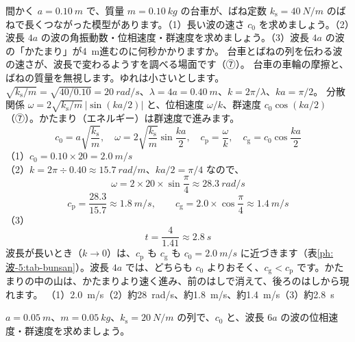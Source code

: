 \label{ph:波-5:ex12}
\begin{phreidai}[ばねとおもりの列の位相速度と群速度]
間かく $a=\qty{0.10}{m}$ で、質量 $m=\qty{0.10}{kg}$ の台車が、ばね定数 $k_{\mathrm s}=\qty{40}{N/m}$ のばねで長くつながった模型があります。（1）長い波の速さ $c_0$ を求めましょう。（2）波長 $4a$ の波の角振動数・位相速度・群速度を求めましょう。（3）波長 $4a$ の波の「かたまり」が\qty{4}{m}進むのに何秒かかりますか。
\phbamen
台車とばねの列を伝わる波の速さが、波長で変わるようすを調べる場面です（⑦）。
\phmushi
台車の車輪の摩擦と、ばねの質量を無視します。ゆれは小さいとします。
\phzu
$\sqrt{k_{\mathrm s}/m}=\sqrt{40/0.10}=\qty{20}{rad/s}$、$\lambda=4a=\qty{0.40}{m}$、$k=2\pi/\lambda$、$ka=\pi/2$。
\phriyu
分散関係 $\omega=2\sqrt{k_{\mathrm s}/m}\,|\sin(ka/2)|$ と、位相速度 $\omega/k$、群速度 $c_0\cos(ka/2)$（⑦）。かたまり（エネルギー）は群速度で進みます。
\phtateru
\[c_0=a\sqrt{\frac{k_{\mathrm s}}{m}},\quad\omega=2\sqrt{\frac{k_{\mathrm s}}{m}}\sin\frac{ka}{2},\quad c_{\mathrm p}=\frac{\omega}{k},\quad c_{\mathrm g}=c_0\cos\frac{ka}{2}\]
\phtoku
（1）$c_0=0.10\times20=\qty{2.0}{m/s}$\\
（2）$k=2\pi\div0.40\approx\qty{15.7}{rad/m}$、$ka/2=\pi/4$ なので、
\[\omega=2\times20\times\sin\frac{\pi}{4}\approx\qty{28.3}{rad/s}\]
\[c_{\mathrm p}=\frac{28.3}{15.7}\approx\qty{1.8}{m/s},\qquad c_{\mathrm g}=2.0\times\cos\frac{\pi}{4}\approx\qty{1.4}{m/s}\]
（3）\[t=\frac{4}{1.41}\approx\qty{2.8}{s}\]
\phtashikame
波長が長いとき（$k\to0$）は、$c_{\mathrm p}$ も $c_{\mathrm g}$ も $c_0=\qty{2.0}{m/s}$ に近づきます（表\ref{ph:波-5:tab-bunsan}）。波長 $4a$ では、どちらも $c_0$ よりおそく、$c_{\mathrm g}<c_{\mathrm p}$ です。かたまりの中の山は、かたまりより速く進み、前のはしで消えて、後ろのはしから現れます。
\kotae （1）\qty{2.0}{m/s}（2）約\qty{28}{rad/s}、約\qty{1.8}{m/s}、約\qty{1.4}{m/s}（3）約\qty{2.8}{s}
\end{phreidai}
\begin{jibun}
$a=\qty{0.05}{m}$、$m=\qty{0.05}{kg}$、$k_{\mathrm s}=\qty{20}{N/m}$ の列で、$c_0$ と、波長 $6a$ の波の位相速度・群速度を求めましょう。
\end{jibun}

